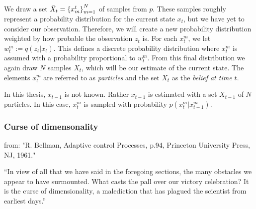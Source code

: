 We draw a set $\bar{X}_t = \left\{x_{m}^{t}\right\}_{m=1}^{N}$ of samples from $p$. These samples roughly represent a probability distribution for the current state $x_t$, but we have yet to consider our observation. Therefore, we will create a new probability distribution weighted by how probable the observation $z_t$ is. For each $x_t^m$, we let $w_t^m := q\left(z_t | x_t\right)$. This defines a discrete probability distribution where $x_t^m$ is assumed with a probability proportional to $w_t^m$. From this final distribution we again draw $N$ samples $X_t$, which will be our estimate of the current state. The elements $x_t^m$ are referred to as \emph{particles} and the set $X_t$ as the \emph{belief at time $t$}.

In this thesis, $x_{t-1}$ is not known. Rather $x_{t-1}$ is estimated with a set $X_{t-1}$ of $N$ particles. In this case, $x_t^m$ is sampled with probability $p\left(x_t^m | x_{t-1}^m\right)$.



\subsubsection{Curse of dimensonality}




from:
"R. Bellman, Adaptive control Processes, p.94, Princeton University Press, NJ,
1961."

“In view of all that we have said in the foregoing
sections, the many obstacles we appear to have
surmounted. What casts the pall over our victory
celebration? It is the curse of dimensionality, a
malediction that has plagued the scientist from
earliest days.”


